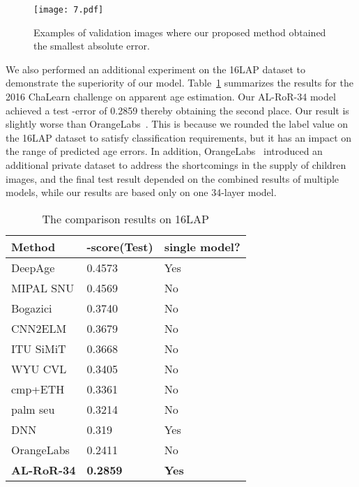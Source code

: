 \documentclass[journal]{IEEEtran}
\begin{document}
\begin{figure}[h]
\centering
\texttt{[image: 7.pdf]}
\caption{Examples of validation images where our proposed method obtained the smallest absolute error.}
\label{fig:smallest absolute error}
\end{figure}
We also performed an additional experiment on the 16LAP dataset to demonstrate the superiority of our model. Table~\ref{tab:16LAP} summarizes the results for the 2016 ChaLearn challenge on apparent age estimation. Our AL-RoR-34 model achieved a test -error of 0.2859 thereby obtaining the second place. Our result is slightly worse than OrangeLabs~\cite{ref-55}. This is because we rounded the label value on the 16LAP dataset to satisfy classification requirements, but it has an impact on the range of predicted age errors. In addition, OrangeLabs~\cite{ref-55} introduced an additional private dataset to address the shortcomings in the supply of children images, and the final test result depended on the combined results of multiple models, while our results are based only on one 34-layer model.
\begin{table}[!t]
\renewcommand{\arraystretch}{1.3}
\caption{The comparison results on 16LAP }
\label{tab:16LAP}
\centering
\begin{tabular}{|p{3.0cm}|p{1.8cm}|p{1.8cm}|}
\hline
Method                           &-score(Test)   &single model?  \\ \hline\hline
DeepAge                         &0.4573                   &Yes                \\\hline
MIPAL SNU                       &0.4569                   &No                 \\\hline
Bogazici~\cite{ref-49}          &0.3740                   &No                \\\hline
CNN2ELM~\cite{ref-50}           &0.3679                   &No                \\\hline
ITU SiMiT~\cite{ref-51}         &0.3668                   &No                \\\hline
WYU CVL                         &0.3405                   &No                \\\hline
cmp+ETH~\cite{ref-52}           &0.3361                   &No               \\\hline
palm seu~\cite{ref-53}          &0.3214                   &No              \\\hline
DNN~\cite{ref-54}               &0.319                    &Yes             \\\hline
OrangeLabs~\cite{ref-55}        &0.2411                   &No            \\\hline
\textbf{AL-RoR-34}                       &\textbf{0.2859}                   &\textbf{Yes}            \\\hline
\end{tabular}
\end{table}
\end{document}
